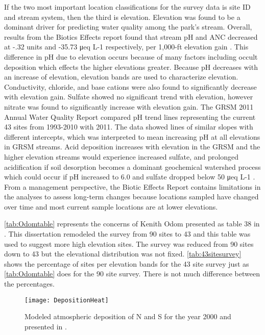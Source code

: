 If the two most important location classifications for the survey data is site ID and stream system, then the third is elevation.
Elevation was found to be a dominant driver for predicting water quality among the park’s stream.  
Overall, results from the Biotics Effects report found that stream pH and ANC decreased at -.32 units and -35.73 μeq L-1 respectively, per 1,000-ft elevation gain \citep{cai2013}. 
This difference in pH due to elevation occurs because of many factors including occult deposition which effects the higher elevations greater.
Because pH decreases with an increase of elevation, elevation bands are used to characterize elevation.
Conductivity, chloride, and base cations were also found to significantly decrease with elevation gain.  
Sulfate showed no significant trend with elevation, however nitrate was found to significantly increase with elevation gain.  
The GRSM 2011 Annual Water Quality Report compared pH trend lines representing the current 43 sites from 1993-2010 with 2011.  
The data showed lines of similar slopes with different intercepts, which was interpreted to mean increasing pH at all elevations in GRSM streams.  
Acid deposition increases with elevation in the GRSM and the higher elevation streams would experience increased sulfate, and prolonged acidification if soil desorption becomes a dominant geochemical watershed process which could occur if pH increased to 6.0 and sulfate dropped below 50 μeq L-1 \citep{annualreport2012}.  
From a management perspective, the Biotic Effects Report contains limitations in the analyses to assess long-term changes because locations sampled have changed over time and most current sample locations are at lower elevations.





\autoref{tab:Odomtable} represents the concerns of Kenith Odom presented as table 38 in \citet{odom2003}.
This dissertation remodeled the survey from 90 sites to 43 and this table was used to suggest more high elevation sites.
The survey was reduced from 90 sites down to 43 but the elevational distribution was not fixed.
\autoref{tab:43sitesurvey} shows the percentage of sites per elevation bands for the 43 site survey just as \autoref{tab:Odomtable} does for the 90 site survey.
There is not much difference between the percentages.

\begin{figure}[h!]
  \centering
  \texttt{[image: DepositionHeat]}\\
  \caption{ Modeled atmospheric deposition of N and S for the year 2000 and presented in \citet{weathers2006}.}\label{fig:depositionheat}
\end{figure}

